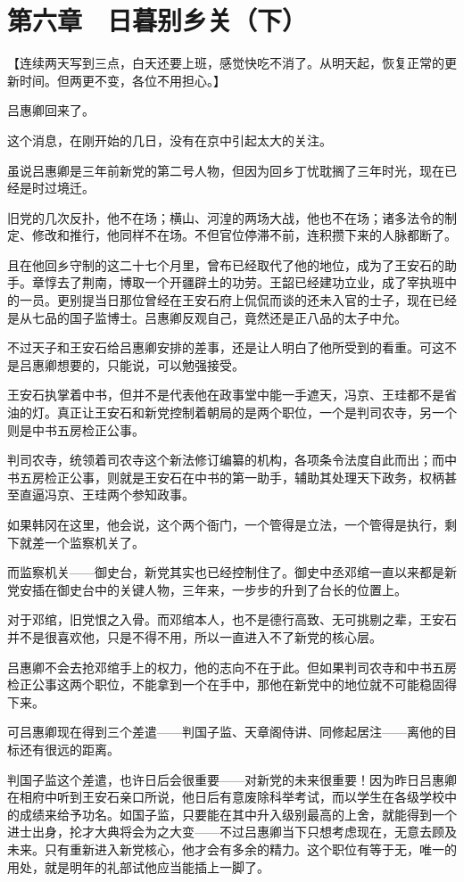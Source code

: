 \section{第六章　日暮别乡关（下）}

【连续两天写到三点，白天还要上班，感觉快吃不消了。从明天起，恢复正常的更新时间。但两更不变，各位不用担心。】

吕惠卿回来了。

这个消息，在刚开始的几日，没有在京中引起太大的关注。

虽说吕惠卿是三年前新党的第二号人物，但因为回乡丁忧耽搁了三年时光，现在已经是时过境迁。

旧党的几次反扑，他不在场；横山、河湟的两场大战，他也不在场；诸多法令的制定、修改和推行，他同样不在场。不但官位停滞不前，连积攒下来的人脉都断了。

且在他回乡守制的这二十七个月里，曾布已经取代了他的地位，成为了王安石的助手。章惇去了荆南，博取一个开疆辟土的功劳。王韶已经建功立业，成了宰执班中的一员。更别提当日那位曾经在王安石府上侃侃而谈的还未入官的士子，现在已经是从七品的国子监博士。吕惠卿反观自己，竟然还是正八品的太子中允。

不过天子和王安石给吕惠卿安排的差事，还是让人明白了他所受到的看重。可这不是吕惠卿想要的，只能说，可以勉强接受。

王安石执掌着中书，但并不是代表他在政事堂中能一手遮天，冯京、王珪都不是省油的灯。真正让王安石和新党控制着朝局的是两个职位，一个是判司农寺，另一个则是中书五房检正公事。

判司农寺，统领着司农寺这个新法修订编纂的机构，各项条令法度自此而出；而中书五房检正公事，则就是王安石在中书的第一助手，辅助其处理天下政务，权柄甚至直逼冯京、王珪两个参知政事。

如果韩冈在这里，他会说，这个两个衙门，一个管得是立法，一个管得是执行，剩下就差一个监察机关了。

而监察机关——御史台，新党其实也已经控制住了。御史中丞邓绾一直以来都是新党安插在御史台中的关键人物，三年来，一步步的升到了台长的位置上。

对于邓绾，旧党恨之入骨。而邓绾本人，也不是德行高致、无可挑剔之辈，王安石并不是很喜欢他，只是不得不用，所以一直进入不了新党的核心层。

吕惠卿不会去抢邓绾手上的权力，他的志向不在于此。但如果判司农寺和中书五房检正公事这两个职位，不能拿到一个在手中，那他在新党中的地位就不可能稳固得下来。

可吕惠卿现在得到三个差遣——判国子监、天章阁侍讲、同修起居注——离他的目标还有很远的距离。

判国子监这个差遣，也许日后会很重要——对新党的未来很重要！因为昨日吕惠卿在相府中听到王安石亲口所说，他日后有意废除科举考试，而以学生在各级学校中的成绩来给予功名。如国子监，只要能在其中升入级别最高的上舍，就能得到一个进士出身，抡才大典将会为之大变——不过吕惠卿当下只想考虑现在，无意去顾及未来。只有重新进入新党核心，他才会有多余的精力。这个职位有等于无，唯一的用处，就是明年的礼部试他应当能插上一脚了。

